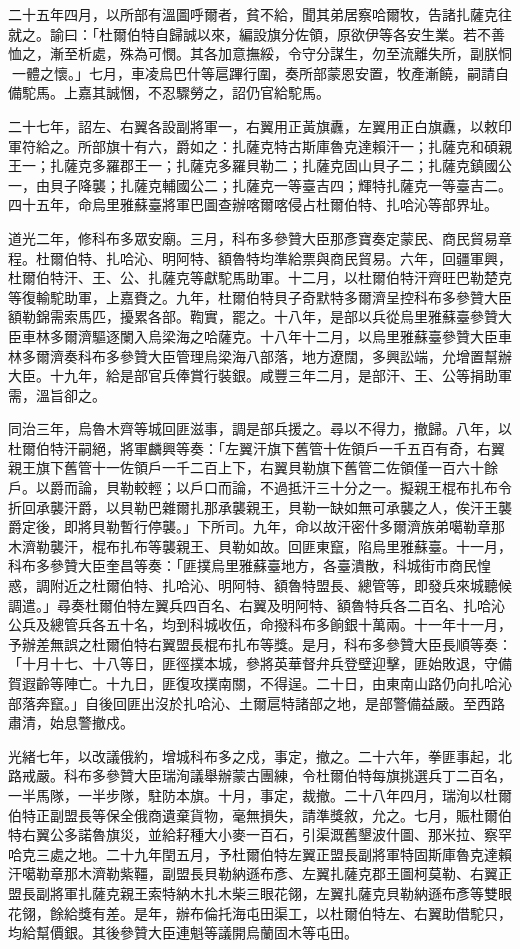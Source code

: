 \begin{pinyinscope}
二十五年四月，以所部有溫圖呼爾者，貧不給，聞其弟居察哈爾牧，告諸扎薩克往就之。諭曰：「杜爾伯特自歸誠以來，編設旗分佐領，原欲伊等各安生業。若不善恤之，漸至析處，殊為可憫。其各加意撫綏，令守分謀生，勿至流離失所，副朕恫一體之懷。」七月，車凌烏巴什等扈蹕行圍，奏所部蒙恩安置，牧產漸饒，嗣請自備駝馬。上嘉其誠悃，不忍驟勞之，詔仍官給駝馬。

二十七年，詔左、右翼各設副將軍一，右翼用正黃旗纛，左翼用正白旗纛，以敕印軍符給之。所部旗十有六，爵如之：扎薩克特古斯庫魯克達賴汗一；扎薩克和碩親王一；扎薩克多羅郡王一；扎薩克多羅貝勒二；扎薩克固山貝子二；扎薩克鎮國公一，由貝子降襲；扎薩克輔國公二；扎薩克一等臺吉四；輝特扎薩克一等臺吉二。四十五年，命烏里雅蘇臺將軍巴圖查辦喀爾喀侵占杜爾伯特、扎哈沁等部界址。

道光二年，修科布多眾安廟。三月，科布多參贊大臣那彥寶奏定蒙民、商民貿易章程。杜爾伯特、扎哈沁、明阿特、額魯特均準給票與商民貿易。六年，回疆軍興，杜爾伯特汗、王、公、扎薩克等獻駝馬助軍。十二月，以杜爾伯特汗齊旺巴勒楚克等復輸駝助軍，上嘉賚之。九年，杜爾伯特貝子奇默特多爾濟呈控科布多參贊大臣額勒錦需索馬匹，擾累各部。鞫實，罷之。十八年，是部以兵從烏里雅蘇臺參贊大臣車林多爾濟驅逐闌入烏梁海之哈薩克。十八年十二月，以烏里雅蘇臺參贊大臣車林多爾濟奏科布多參贊大臣管理烏梁海八部落，地方遼闊，多興訟端，允增置幫辦大臣。十九年，給是部官兵俸賞行裝銀。咸豐三年二月，是部汗、王、公等捐助軍需，溫旨卻之。

同治三年，烏魯木齊等城回匪滋事，調是部兵援之。尋以不得力，撤歸。八年，以杜爾伯特汗嗣絕，將軍麟興等奏：「左翼汗旗下舊管十佐領戶一千五百有奇，右翼親王旗下舊管十一佐領戶一千二百上下，右翼貝勒旗下舊管二佐領僅一百六十餘戶。以爵而論，貝勒較輕；以戶口而論，不過抵汗三十分之一。擬親王棍布扎布令折回承襲汗爵，以貝勒巴雜爾扎那承襲親王，貝勒一缺如無可承襲之人，俟汗王襲爵定後，即將貝勒暫行停襲。」下所司。九年，命以故汗密什多爾濟族弟噶勒章那木濟勒襲汗，棍布扎布等襲親王、貝勒如故。回匪東竄，陷烏里雅蘇臺。十一月，科布多參贊大臣奎昌等奏：「匪撲烏里雅蘇臺地方，各臺潰散，科城街市商民惶惑，調附近之杜爾伯特、扎哈沁、明阿特、額魯特盟長、總管等，即發兵來城聽候調遣。」尋奏杜爾伯特左翼兵四百名、右翼及明阿特、額魯特兵各二百名、扎哈沁公兵及總管兵各五十名，均到科城收伍，命撥科布多餉銀十萬兩。十一年十一月，予辦差無誤之杜爾伯特右翼盟長棍布扎布等獎。是月，科布多參贊大臣長順等奏：「十月十七、十八等日，匪徑撲本城，參將英華督弁兵登壁迎擊，匪始敗退，守備賀遐齡等陣亡。十九日，匪復攻撲南關，不得逞。二十日，由東南山路仍向扎哈沁部落奔竄。」自後回匪出沒於扎哈沁、土爾扈特諸部之地，是部警備益嚴。至西路肅清，始息警撤戍。

光緒七年，以改議俄約，增城科布多之戍，事定，撤之。二十六年，拳匪事起，北路戒嚴。科布多參贊大臣瑞洵議舉辦蒙古團練，令杜爾伯特每旗挑選兵丁二百名，一半馬隊，一半步隊，駐防本旗。十月，事定，裁撤。二十八年四月，瑞洵以杜爾伯特正副盟長等保全俄商遺棄貨物，毫無損失，請準獎敘，允之。七月，賑杜爾伯特右翼公多諾魯旗災，並給耔種大小麥一百石，引渠溉舊墾波什圖、那米拉、察罕哈克三處之地。二十九年閏五月，予杜爾伯特左翼正盟長副將軍特固斯庫魯克達賴汗噶勒章那木濟勒紫韁，副盟長貝勒納遜布彥、左翼扎薩克郡王圖柯莫勒、右翼正盟長副將軍扎薩克親王索特納木扎木柴三眼花翎，左翼扎薩克貝勒納遜布彥等雙眼花翎，餘給獎有差。是年，辦布倫托海屯田渠工，以杜爾伯特左、右翼助借駝只，均給幫價銀。其後參贊大臣連魁等議開烏蘭固木等屯田。


\end{pinyinscope}
